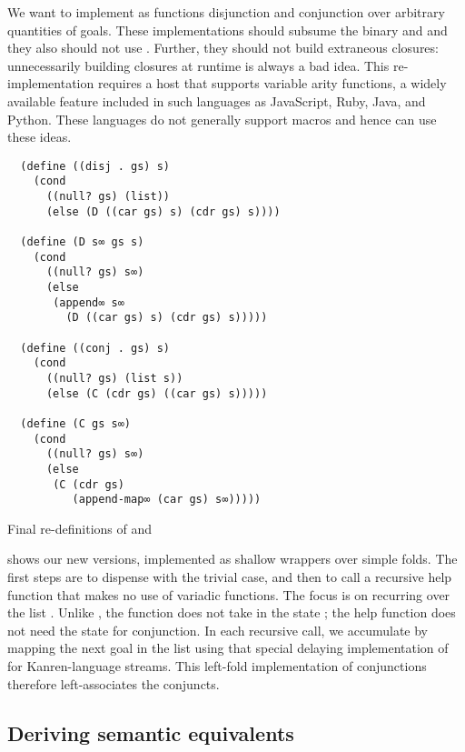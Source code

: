\documentclass[sigplan,balance,pbalance,natbib=false]{acmart}
\begin{document}
We want to implement as functions disjunction and conjunction over
arbitrary quantities of goals. These implementations should subsume
the binary  and  and they also
should not use . Further, they should not build
extraneous closures: unnecessarily building closures at runtime is
always a bad idea. This re-implementation requires a host that
supports variable arity functions, a widely available feature included
in such languages as JavaScript, Ruby, Java, and Python. These
languages do not generally support macros and hence can use these ideas.

\begin{listing}
\begin{verbatim}
  (define ((disj . gs) s)
    (cond
      ((null? gs) (list))
      (else (D ((car gs) s) (cdr gs) s))))

  (define (D s∞ gs s)
    (cond
      ((null? gs) s∞)
      (else
       (append∞ s∞
         (D ((car gs) s) (cdr gs) s)))))

  (define ((conj . gs) s)
    (cond
      ((null? gs) (list s))
      (else (C (cdr gs) ((car gs) s)))))

  (define (C gs s∞)
    (cond
      ((null? gs) s∞)
      (else
       (C (cdr gs)
          (append-map∞ (car gs) s∞)))))
\end{verbatim}
  \caption{Final re-definitions of  and }\label{mnt:disj-reimplementation}
\end{listing}

 shows our new versions, implemented
as shallow wrappers over simple folds. The first steps are to dispense
with the trivial case, and then to call a recursive help function that
makes no use of variadic functions. The focus is on recurring over the
list . Unlike , the
function  does not take in the state ; the
help function does not need the state for conjunction. In each
recursive call, we accumulate by mapping the next goal in the list
using that special delaying implementation of 
for Kanren-language streams. This left-fold implementation of
conjunctions therefore left-associates the conjuncts.

\subsection{Deriving semantic equivalents}
\end{document}
